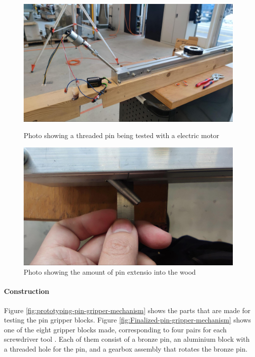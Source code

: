 \begin{figure}[!h]
    \centering
    \begin{minipage}[b]{0.49\textwidth}
        \centering
        \includegraphics[width=\textwidth]{images/7a/img41.jpg}
        \caption{Photo showing a threaded pin being tested with a electric motor}
    \end{minipage}
    \hfill
    \begin{minipage}[b]{0.49\textwidth}
        \centering
        \includegraphics[width=\textwidth]{images/7a/img42.jpg}
        \caption{Photo showing the amount of pin extensio into the wood}
    \end{minipage}
\end{figure}



\paragraph{Construction}
Figure \ref{fig:prototyping-pin-gripper-mechanism} shows the parts that are made for testing the pin gripper blocks. Figure \ref{fig:Finalized-pin-gripper-mechanism} shows one of the eight gripper blocks made, corresponding to four pairs for each screwdriver tool . Each of them consist of a bronze pin, an aluminium block with a threaded hole for the pin, and a gearbox assembly that rotates the bronze pin.

